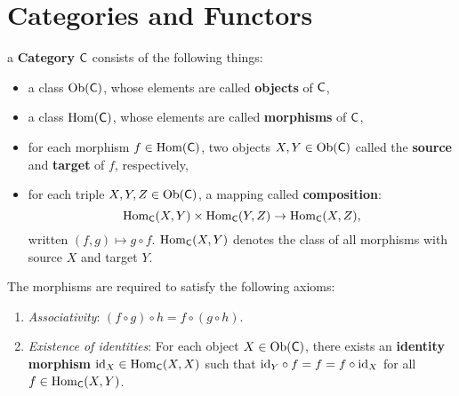 \section{Categories and Functors}
a \textbf{Category} $\mathsf{C}$ consists of the following things:
\begin{itemize}
    \item a class $\mathrm{Ob}(\mathsf{C})$, whose elements are called \textbf{objects} of $\mathsf{C}$,
    \item a class $\mathrm{Hom}(\mathsf{C})$, whose elements are called \textbf{morphisms} of $\mathsf{C}$,
    \item for each morphism $f \in \mathrm{Hom}(\mathsf{C})$, two objects $X,Y \in \mathrm{Ob}(\mathsf{C})$ called the \textbf{source} and \textbf{target} of $f$, respectively,
    \item for each triple $X,Y,Z \in \mathrm{Ob}(\mathsf{C})$, a mapping called \textbf{composition}:
    $$\mathrm{Hom}_{\mathsf{C}}(X,Y) \times \mathrm{Hom}_{\mathsf{C}}(Y,Z) \to \mathrm{Hom}_{\mathsf{C}}(X,Z), $$
    written $(f,g) \mapsto g \circ f$. $\mathrm{Hom}_{\mathsf{C}}(X,Y)$ denotes the class of all morphisms with source $X$ and target $Y$.
\end{itemize}
The morphisms are required to satisfy the following axioms:
\begin{enumerate}
    \item \textit{Associativity}: $(f \circ g) \circ h = f \circ (g \circ h)$. 
    \item \textit{Existence of identities}: For each object $X \in \mathrm{Ob}(\mathsf{C})$, there exists an \textbf{identity morphism} $\mathrm{id}_X \in \mathrm{Hom}_{\mathsf{C}}(X,X)$ such that 
    $\mathrm{id}_Y \circ f = f = f \circ \mathrm{id}_X$ for all $f \in \mathrm{Hom}_{\mathsf{C}}(X,Y)$. 
\end{enumerate}